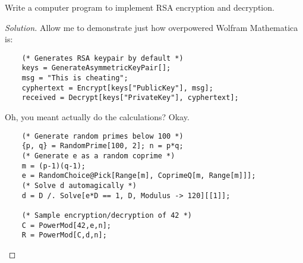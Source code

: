 \question Write a computer program to implement RSA encryption and decryption.
\begin{proof}[Solution]
  Allow me to demonstrate just how overpowered Wolfram Mathematica is:
  \begin{verbatim}
    (* Generates RSA keypair by default *)
    keys = GenerateAsymmetricKeyPair[];
    msg = "This is cheating";
    cyphertext = Encrypt[keys["PublicKey"], msg];
    received = Decrypt[keys["PrivateKey"], cyphertext];
  \end{verbatim}
  Oh, you meant actually do the calculations? Okay.
  \begin{verbatim}
    (* Generate random primes below 100 *)
    {p, q} = RandomPrime[100, 2]; n = p*q;
    (* Generate e as a random coprime *)
    m = (p-1)(q-1);
    e = RandomChoice@Pick[Range[m], CoprimeQ[m, Range[m]]];
    (* Solve d automagically *)
    d = D /. Solve[e*D == 1, D, Modulus -> 120][[1]];

    (* Sample encryption/decryption of 42 *)
    C = PowerMod[42,e,n];
    R = PowerMod[C,d,n];
  \end{verbatim}
\end{proof}

